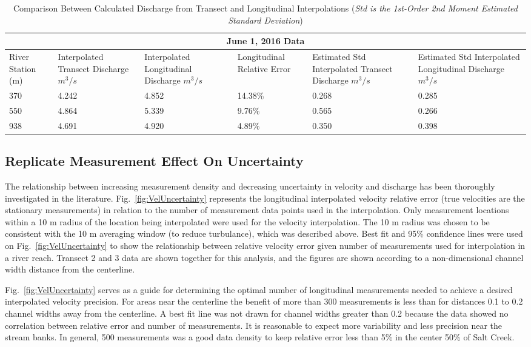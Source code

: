 \documentclass[Journal,letterpaper,BackFigs]{ascelike-new}
\begin{document}
\begin{table}
\caption{Comparison Between Calculated Discharge from Transect and Longitudinal Interpolations (\textit{Std is the 1st-Order 2nd Moment Estimated Standard Deviation})}
\label{table:DischargeErr}
\centering
\begin{tabular}{p{1.3cm}p{1.8cm}p{1.8cm}p{1.8cm}p{2.8cm}p{2.5cm}}
\hline\hline
\multicolumn{6}{c}{June 1, 2016 Data} \\
\hline\hline
River Station (m) &
Interpolated Transect Discharge \(m^{3}/s\) &
Interpolated Longitudinal Discharge \(m^{3}/s\)  &
Longitudinal Relative Error &
Estimated Std Interpolated Transect Discharge \(m^{3}/s\) &
Estimated Std Interpolated Longitudinal Discharge \(m^{3}/s\)\\
\hline
370 & 4.242 & 4.852 & 14.38\% & 0.268 & 0.285\\
550 & 4.864 & 5.339 & 9.76\% & 0.565 & 0.266\\
938 & 4.691 & 4.920 & 4.89\% & 0.350 & 0.398\\

\hline\hline
\end{tabular}
\end{table}

\subsection{Replicate Measurement Effect On Uncertainty}

The relationship between increasing measurement density and decreasing uncertainty in velocity and discharge has been thoroughly investigated in the literature. Fig.~\ref{fig:VelUncertainty} represents the longitudinal interpolated velocity relative error (true velocities are the stationary measurements) in relation to the number of measurement data points used in the interpolation. Only measurement locations within a 10 m radius of the location being interpolated were used for the velocity interpolation. The 10 m radius was chosen to be consistent with the 10 m averaging window (to reduce turbulance), which was described above. Best fit and 95\% confidence lines were used on Fig.~\ref{fig:VelUncertainty} to show the relationship between relative velocity error given number of measurements used for interpolation in a river reach. Transect 2 and 3 data are shown together for this analysis, and the figures are shown according to a non-dimensional channel width distance from the centerline.  

Fig.~\ref{fig:VelUncertainty} serves as a guide for determining the optimal number of longitudinal measurements needed to achieve a desired interpolated velocity precision. For areas near the centerline the benefit of more than 300 measurements is less than for distances 0.1 to 0.2 channel widths away from the centerline. A best fit line was not drawn for channel widths greater than 0.2 because the data showed no correlation between relative error and number of measurements. It is reasonable to expect more variability and less precision near the stream banks. In general, 500 measurements was a good data density to keep relative error less than 5\% in the center 50\% of Salt Creek.
\end{document}
